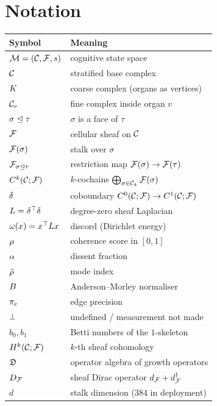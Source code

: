\chapter{Notation}\label{app:notation}

\begin{longtable}{ll}
\toprule
Symbol & Meaning \\
\midrule
\endhead
$\mathcal{M}=(\mathcal{C},\mathcal{F},s)$ & cognitive state space \\
$\mathcal{C}$ & stratified base complex \\
$K$ & coarse complex (organs as vertices) \\
$\mathcal{C}_v$ & fine complex inside organ $v$ \\
$\sigma\trianglelefteq\tau$ & $\sigma$ is a face of $\tau$ \\
$\mathcal{F}$ & cellular sheaf on $\mathcal{C}$ \\
$\mathcal{F}(\sigma)$ & stalk over $\sigma$ \\
$\mathcal{F}_{\sigma\trianglelefteq\tau}$ & restriction map $\mathcal{F}(\sigma)\to\mathcal{F}(\tau)$ \\
$C^{k}(\mathcal{C};\mathcal{F})$ & $k$-cochains $\bigoplus_{\sigma\in\mathcal{C}_k}\mathcal{F}(\sigma)$ \\
$\delta$ & coboundary $C^{0}(\mathcal{C};\mathcal{F})\to C^{1}(\mathcal{C};\mathcal{F})$ \\
$L=\delta^\top\delta$ & degree-zero sheaf Laplacian \\
$\omega(x)=x^\top L x$ & discord (Dirichlet energy) \\
$\rho$ & coherence score in $[0,1]$ \\
$\alpha$ & dissent fraction \\
$\tilde{\rho}$ & mode index \\
$B$ & Anderson--Morley normaliser \\
$\pi_e$ & edge precision \\
$\bot$ & undefined / measurement not made \\
$b_0,b_1$ & Betti numbers of the $1$-skeleton \\
$H^{k}(\mathcal{C};\mathcal{F})$ & $k$-th sheaf cohomology \\
$\mathfrak{D}$ & operator algebra of growth operators \\
$D_{\mathcal{F}}$ & sheaf Dirac operator $d_{\mathcal{F}}+d_{\mathcal{F}}^\dagger$ \\
$d$ & stalk dimension ($384$ in deployment) \\
\bottomrule
\end{longtable}
